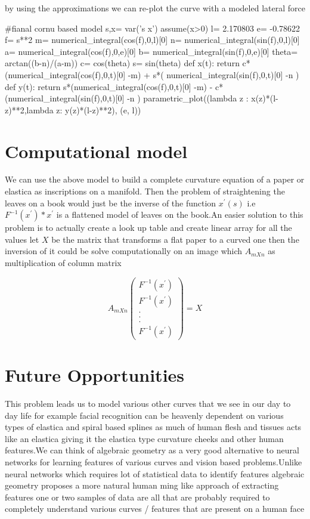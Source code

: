\documentclass[longbibliography]{revtex4-1}
\begin{document}
 by using the approximations we can re-plot the curve with a modeled lateral force

\begin{sageblock}
#fianal cornu based model
s,x= var('s x')
assume(x>0)
l= 2.170803
e= -0.78622
f= s**2
m= numerical_integral(cos(f),0,l)[0]
n= numerical_integral(sin(f),0,l)[0]
a= numerical_integral(cos(f),0,e)[0]
b= numerical_integral(sin(f),0,e)[0]
theta= arctan((b-n)/(a-m))
c= cos(theta)
s= sin(theta)
def x(t): return c*(numerical_integral(cos(f),0,t)[0] -m) + s*( numerical_integral(sin(f),0,t)[0] -n )
def y(t): return s*(numerical_integral(cos(f),0,t)[0] -m) - c*(numerical_integral(sin(f),0,t)[0] -n )
parametric_plot((lambda z : x(z)*(l-z)**2,lambda z: y(z)*(l-z)**2), (e, l))
\end{sageblock}


\section{Computational model}
We can use the above model to build a complete curvature equation of a paper or elastica as inscriptions on a manifold.
Then the problem of straightening the leaves on a book would just be the inverse of the function $x^{'}(s)$
i.e $F^{-1}(x^{'})*x^{'}$ is a flattened model of leaves on the book.An easier solution to this problem is to actually create a look up table and create linear array for all the values let $X$ be the matrix that transforms a flat paper to  a curved one then the inversion of it could be solve computationally on an image which $A_{mXn}$ as multiplication of column matrix

\[A_{mXn} \left( \begin{array}{ccc}
F^{-1}(x^{'}) \\
F^{-1}(x^{'}) \\
.\\
.\\
.\\
F^{-1}(x^{'}) \end{array} \right) = X\] 

\section{Future Opportunities}
This problem leads us to model various other curves that we see in our day to day life for example facial recognition can be heavenly dependent on various types of elastica and spiral based splines as much of human flesh and tissues acts like an elastica  giving it the elastica type curvature cheeks and other human features.We can think of algebraic geometry as a very good alternative to neural networks for learning features of various curves and vision based problems.Unlike neural networks which requires lot of statistical data to identify  features algebraic geometry proposes a more natural human ming like approach of extracting features one or two samples of data are all that are probably required to completely understand various curves / features that are present on a human face


\end{document}
